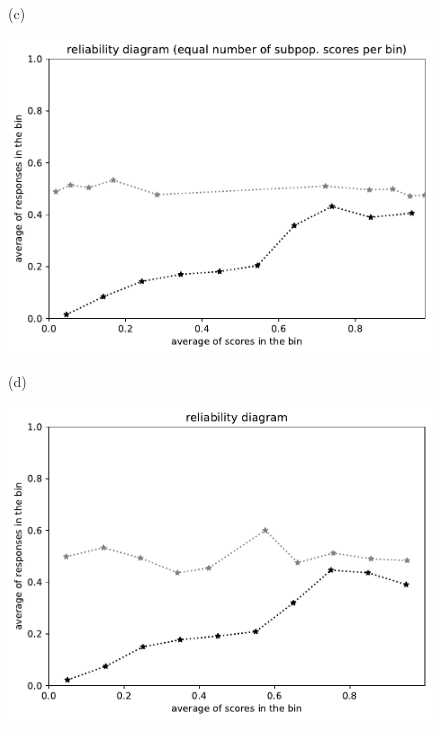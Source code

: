 \documentclass{article}
\newlength{\vertsep}
\newlength{\imsize}
\begin{document}
\begin{figure}
\begin{centering}
\vspace{\vertsep}

(c)
\parbox{\imsize}{\includegraphics[width=\imsize]
{../codes/unweighted/10000_7000_10_2/equisamps.pdf}}
\quad\quad
(d)
\parbox{\imsize}{\includegraphics[width=\imsize]
{../codes/unweighted/10000_7000_10_2/equiscore.pdf}}

\vspace{\vertsep}


\end{centering}
\end{figure}
\end{document}
